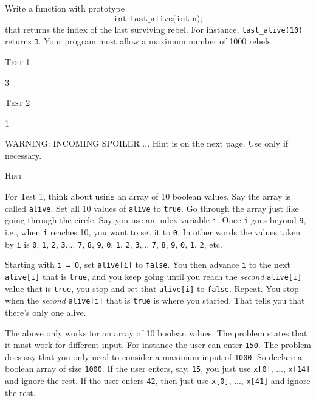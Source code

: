 Write a function with prototype
\[
\texttt{int last\_alive(int n);}
\]
that returns the index of the last surviving rebel.
For instance, \texttt{last\_alive(10)} returns \verb!3!.
Your program must allow a maximum number of 1000 rebels.

\textsc{Test 1}
\begin{console}[commandchars=\\\{\}]
3
\end{console}

\textsc{Test 2}
\begin{console}[commandchars=\\\{\}]
1
\end{console}

WARNING: INCOMING SPOILER ... Hint is on the next page.
Use only if necessary.

\newpage
\textsc{Hint}

For Test 1, think about using an array of 10 boolean values.
Say the array is called \verb!alive!.
Set all 10 values of \verb!alive! to \verb!true!.
Go through the array just like going through the circle.
Say you use an index variable \verb!i!.
Once \verb!i! goes beyond \verb!9!, i.e.,
when \verb!i! reaches 10, you want to set it to \verb!0!.
In other words the values taken by \verb!i! is
\verb!0!,
\verb!1!,
\verb!2!,
\verb!3!,...
\verb!7!,
\verb!8!,
\verb!9!,
\verb!0!,
\verb!1!,
\verb!2!,
\verb!3!,...
\verb!7!,
\verb!8!,
\verb!9!,
\verb!0!,
\verb!1!,
\verb!2!,
etc.

Starting with \verb!i = 0!, set \verb!alive[i]! to \verb!false!.
You then advance \verb!i! to the next
\verb!alive[i]! that is
\verb!true!, and you keep going
until you reach the \textit{second} \verb!alive[i]! value that is \verb!true!,
you stop and set that \verb!alive[i]! to \verb!false!. Repeat.
You stop when the \textit{second}
\verb!alive[i]! that is \verb!true!
is where you started.
That tells you that there's only one alive.

The above only works for an array of 10 boolean values.
The problem states that it must work for different input.
For instance the user can enter \verb!150!.
The problem does say that you only need to consider a maximum input
of \verb!1000!.
So declare a boolean array of size \verb!1000!.
If the user enters, say, \verb!15!, you just use \verb!x[0]!, ...,
\verb!x[14]! and ignore the rest.
If the user enters \verb!42!, then just use
\verb!x[0]!, ...,
\verb!x[41]!
and ignore the rest.
